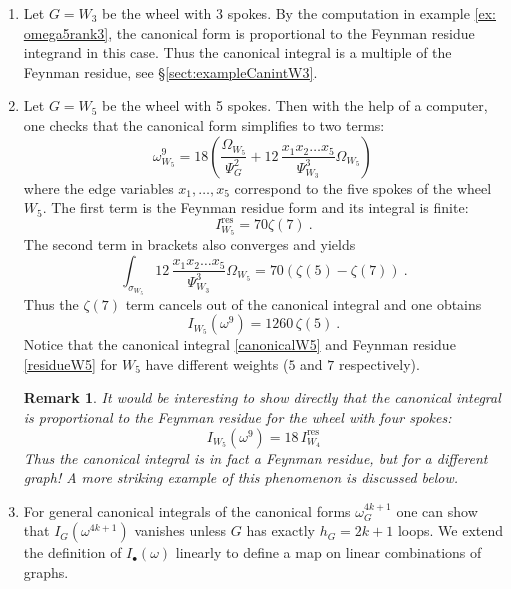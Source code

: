 \documentclass[12pt]{amsart}
\newcommand{\res}{\mathrm{res}}
\theoremstyle{plain}
\newtheorem{remark}[thm]{Remark}
\newcommand{\0}{\color{blue}{\mathsf{0}}}
\begin{document}
 
 \begin{enumerate}
 \item Let $G= W_3$ be the  wheel with 3 spokes. By the computation in example \ref{ex: omega5rank3}, the canonical form is proportional to the Feynman residue integrand in this case. Thus the canonical integral is a multiple of the Feynman residue,  see \S \ref{sect:exampleCanintW3}. \\
 
 \item  Let $G= W_5$ be the wheel with 5 spokes. Then with the help of a  computer, one checks that the canonical form simplifies to two terms:
 \[  \omega^9_{W_5} =  18 \left( \frac{\Omega_{W_5}}{\Psi_G^2} +   12 \, \frac{x_1x_2\ldots x_5}{\Psi_{W_3}^3} \Omega_{W_5} \right)  \,  \]
 where the edge variables $x_1,\ldots, x_5$ correspond to the five spokes of the wheel $W_5$. The first term is the Feynman residue form and its integral is finite:
 \begin{equation} \label{residueW5} I^{\res}_{W_5} = 70 \zeta(7) \ . \end{equation} 
 The second term  in brackets also converges and yields
 \[  \int_{\sigma_{W_5}}  12 \,  \frac{x_1x_2\ldots x_5}{\Psi_{W_3}^3} \Omega_{W_5} = 70 (\zeta(5) - \zeta(7))\ . \]
 Thus the $\zeta(7)$ term cancels out of the canonical integral and one obtains
 \begin{equation}  \label{canonicalW5} I_{W_5} (\omega^9) =  1260 \, \zeta(5)\ .\end{equation}
 Notice that the canonical integral \eqref{canonicalW5} and Feynman residue \eqref{residueW5} for $W_5$ have different weights ($5$ and $7$ respectively).
 
 \begin{remark} It would be interesting to show  directly that the canonical integral is proportional to the Feynman residue for the wheel with \emph{four} spokes: 
 \[ I_{W_5} (\omega^9) =  18\,  I^{\res}_{W_4} \] 
 Thus the canonical integral is in fact a Feynman residue, but for a different graph! A more striking example of this phenomenon is discussed below.
 \end{remark} 
 


\item  For general canonical integrals of the canonical forms $\omega_G^{4k+1}$ one can show that $I_G(\omega^{4k+1})$ vanishes unless 
$G$ has exactly $h_G= 2k+1$ loops.   We extend the definition of $I_{\bullet}(\omega)$ linearly to define a map on linear combinations of graphs.


\end{enumerate}
\end{document}
